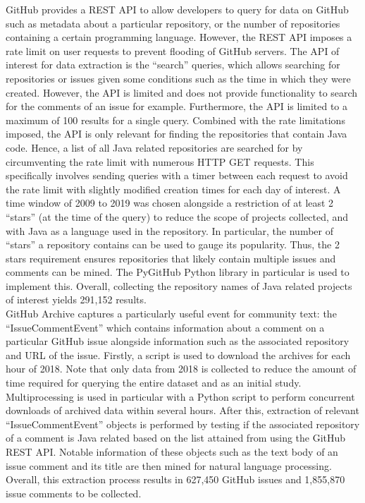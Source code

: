 GitHub provides a REST API to allow developers to query for data on GitHub such as metadata about a particular repository, or the number of repositories containing a certain programming language. However, the REST API imposes a rate limit on user requests to prevent flooding of GitHub servers. The API of interest for data extraction is the ``search'' queries, which allows searching for repositories or issues given some conditions such as the time in which they were created. However, the API is limited and does not provide functionality to search for the comments of an issue for example. Furthermore, the API is limited to a maximum of 100 results for a single query. Combined with the rate limitations imposed, the API is only relevant for finding the repositories that contain Java code. Hence, a list of all Java related repositories are searched for by circumventing the rate limit with numerous HTTP GET requests. This specifically involves sending queries with a timer between each request to avoid the rate limit with slightly modified creation times for each day of interest. A time window of 2009 to 2019 was chosen alongside a restriction of at least 2 ``stars'' (at the time of the query) to reduce the scope of projects collected, and with Java as a language used in the repository. In particular, the number of ``stars'' a repository contains can be used to gauge its popularity. Thus, the 2 stars requirement ensures repositories that likely contain multiple issues and comments can be mined. The PyGitHub Python library in particular is used to implement this. Overall, collecting the repository names of Java related projects of interest yields 291,152 results. \\

GitHub Archive captures a particularly useful event for community text: the ``IssueCommentEvent'' which contains information about a comment on a particular GitHub issue alongside information such as the associated repository and URL of the issue. Firstly, a script is used to download the archives for each hour of 2018. Note that only data from 2018 is collected to reduce the amount of time required for querying the entire dataset and as an initial study. Multiprocessing is used in particular with a Python script to perform concurrent downloads of archived data within several hours. After this, extraction of relevant ``IssueCommentEvent'' objects is performed by testing if the associated repository of a comment is Java related based on the list attained from using the GitHub REST API. Notable information of these objects such as the text body of an issue comment and its title are then mined for natural language processing. Overall, this extraction process results in 627,450 GitHub issues and 1,855,870 issue comments to be collected.

